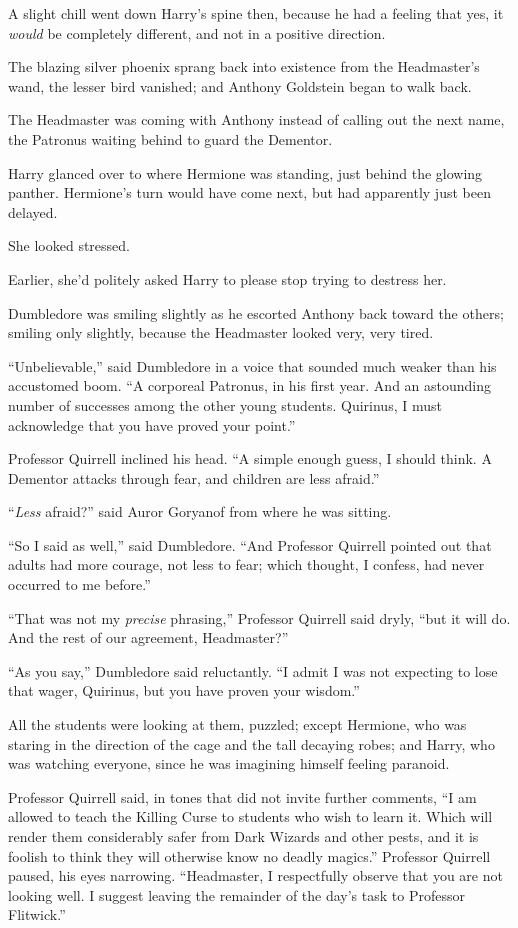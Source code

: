 A slight chill went down Harry's spine then, because he had a feeling
that yes, it \emph{would} be completely different, and not in a positive
direction.

The blazing silver phoenix sprang back into existence from the
Headmaster's wand, the lesser bird vanished; and Anthony Goldstein began
to walk back.

The Headmaster was coming with Anthony instead of calling out the next
name, the Patronus waiting behind to guard the Dementor.

Harry glanced over to where Hermione was standing, just behind the
glowing panther. Hermione's turn would have come next, but had
apparently just been delayed.

She looked stressed.

Earlier, she'd politely asked Harry to please stop trying to destress
her.

Dumbledore was smiling slightly as he escorted Anthony back toward the
others; smiling only slightly, because the Headmaster looked very, very
tired.

``Unbelievable,'' said Dumbledore in a voice that sounded much weaker
than his accustomed boom. ``A corporeal Patronus, in his first year. And
an astounding number of successes among the other young students.
Quirinus, I must acknowledge that you have proved your point.''

Professor Quirrell inclined his head. ``A simple enough guess, I should
think. A Dementor attacks through fear, and children are less afraid.''

``\emph{Less} afraid?'' said Auror Goryanof from where he was sitting.

``So I said as well,'' said Dumbledore. ``And Professor Quirrell pointed
out that adults had more courage, not less to fear; which thought, I
confess, had never occurred to me before.''

``That was not my \emph{precise} phrasing,'' Professor Quirrell said
dryly, ``but it will do. And the rest of our agreement, Headmaster?''

``As you say,'' Dumbledore said reluctantly. ``I admit I was not
expecting to lose that wager, Quirinus, but you have proven your
wisdom.''

All the students were looking at them, puzzled; except Hermione, who was
staring in the direction of the cage and the tall decaying robes; and
Harry, who was watching everyone, since he was imagining himself feeling
paranoid.

Professor Quirrell said, in tones that did not invite further comments,
``I am allowed to teach the Killing Curse to students who wish to learn
it. Which will render them considerably safer from Dark Wizards and
other pests, and it is foolish to think they will otherwise know no
deadly magics.'' Professor Quirrell paused, his eyes narrowing.
``Headmaster, I respectfully observe that you are not looking well. I
suggest leaving the remainder of the day's task to Professor Flitwick.''

